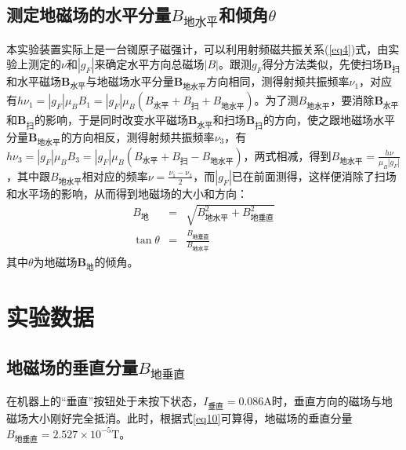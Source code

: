 \documentclass[a4paper]{article}
\begin{document}
\subsection{测定地磁场的水平分量$B_{\text{地水平}}$和倾角$\theta$}
本实验装置实际上是一台铷原子磁强计，可以利用射频磁共振关系(\ref{eq4})式，由实验上测定的$\nu$和$|g_F|$来确定水平方向总磁场$|B|$。跟测$g_F$得分方法类似，先使扫场$\bm{B}_{\text{扫}}$和水平磁场$\bm{B}_{\text{水平}}$与地磁场水平分量$\bm{B}_{\text{地水平}}$方向相同，测得射频共振频率$\nu_1$，对应有$h\nu_1 = |g_F|\mu_BB_1 = |g_F|\mu_B(B_{\text{水平}} + B_{\text{扫}} + B_{\text{地水平}})$。为了测$B_{\text{地水平}}$，要消除$\bm{B}_{\text{水平}}$和$\bm{B}_{\text{扫}}$的影响，于是同时改变水平磁场$\bm{B}_{\text{水平}}$和扫场$\bm{B}_{\text{扫}}$的方向，使之跟地磁场水平分量$\bm{B}_{\text{地水平}}$的方向相反，测得射频共振频率$\nu_3$，有$h\nu_3 = |g_F|\mu_BB_3 = |g_F|\mu_B(B_{\text{水平}} + B_{\text{扫}} - B_{\text{地水平}})$，两式相减，得到$B_{\text{地水平}} = \frac{h\nu}{\mu_B|g_F|}$，其中跟$B_{\text{地水平}}$相对应的频率$\nu = \frac{\nu_1 - \nu_3}{2}$，而$|g_F|$已在前面测得，这样便消除了扫场和水平场的影响，从而得到地磁场的大小和方向：
\begin{eqnarray}
B_{\text{地}} &=& \sqrt{B^2_{\text{地水平}} + B^2_{\text{地垂直}}}\label{eq7}\\
\tan\theta &=& \frac{B_{\text{地垂直}}}{B_{\text{地水平}}}\label{eq8}
\end{eqnarray}
其中$\theta$为地磁场$\bm{B}_{\text{地}}$的倾角。

\section{实验数据}
\subsection{地磁场的垂直分量$B_{\text{地垂直}}$}
在机器上的“垂直”按钮处于未按下状态，$I_{\text{垂直}} = 0.086\text{A}$时，垂直方向的磁场与地磁场大小刚好完全抵消。此时，根据式\ref{eq10}可算得，地磁场的垂直分量$B_{\text{地垂直}} = 2.527\times 10^{-5}  \text{T}$。
\end{document}
